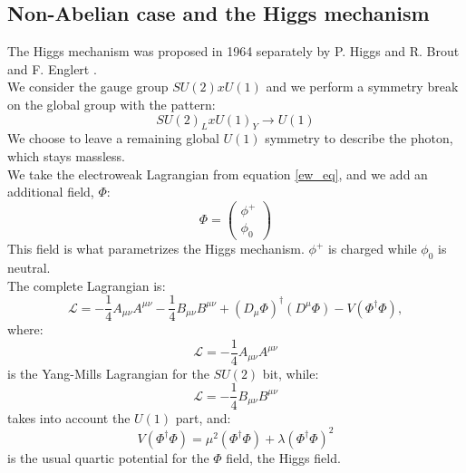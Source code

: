\subsection{Non-Abelian case and the Higgs mechanism}
The Higgs mechanism was proposed in 1964 separately by P. Higgs \cite{higgs_art} and R. Brout and F. Englert \cite{brout_art}.\\
We consider the gauge group $SU(2)xU(1)$ \cite{weinberg} and we perform a symmetry break on the global group with the pattern:
\begin{equation}
    SU(2)_L x U(1)_Y \rightarrow U(1)
\end{equation}
We choose to leave a remaining global $U(1)$ symmetry to describe the photon, which stays massless.\\
We take the electroweak Lagrangian from equation \ref{ew_eq}, and we add an additional field, $\Phi$:
\begin{equation}
    \Phi =
    \begin{pmatrix}
        \phi^+\\ \phi_0
    \end{pmatrix}
\end{equation}
This field is what parametrizes the Higgs mechanism. $\phi^+$ is charged while $\phi_0$ is neutral.\\
The complete Lagrangian is:
\begin{equation}
    \mathcal{L}= -\frac{1}{4}A_{\mu\nu}A^{\mu\nu} -\frac{1}{4}B_{\mu\nu}B^{\mu\nu} + \left(D_{\mu}\Phi\right)^{\dagger}\left(D^{\mu}\Phi\right) - V(\Phi^{\dagger}\Phi), 
\end{equation}
where:
\begin{equation}
   \mathcal{L} =  -\frac{1}{4}A_{\mu\nu}A^{\mu\nu}
\end{equation}
is the Yang-Mills Lagrangian for the $SU(2)$ bit, while:
\begin{equation}
    \mathcal{L} = -\frac{1}{4}B_{\mu\nu}B^{\mu\nu}
\end{equation}
takes into account the $U(1)$ part, and:
\begin{equation*}
    V(\Phi^{\dagger}\Phi) = \mu^2(\Phi^{\dagger}\Phi) + \lambda(\Phi^{\dagger}\Phi)^2
\end{equation*}
is the usual quartic potential for the $\Phi$ field, the Higgs field.

